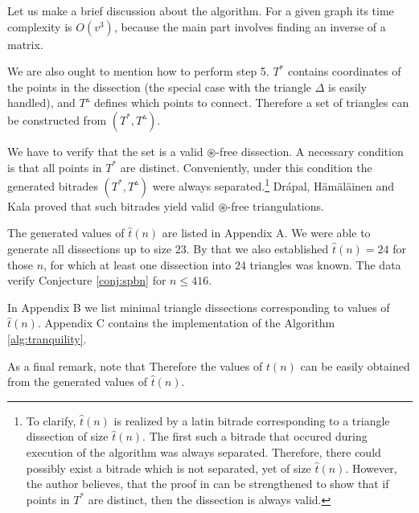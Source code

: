Let us make a brief discussion about the algorithm. For a given graph its time complexity is $O(v^3)$, because the main part involves finding an inverse of a matrix.

We are also ought to mention how to perform step 5. $T^*$ contains coordinates of the points in the dissection (the special case with the triangle $\Delta$ is easily handled), and $T^\vartriangle$ defines which points to connect. Therefore a set of triangles can be constructed from $(T^*,T^\vartriangle)$.

We have to verify that the set is a valid $\circledast$-free dissection. A necessary condition is that all points in $T^*$ are distinct. Conveniently, under this condition the generated bitrades $(T^*,T^\vartriangle)$ were always separated.\footnote{To clarify, $\hat t(n)$ is realized by a latin bitrade corresponding to a triangle dissection of size $\hat t(n)$. The first such a bitrade that occured during execution of the algorithm was always separated. Therefore, there could possibly exist a bitrade which is not separated, yet of size $\hat t(n)$. However, the author believes, that the proof in \cite{DrapalHamalainenKala10} can be strengthened to show that if points in $T^*$ are distinct, then the dissection is always valid.} Drápal, Hämäläinen and Kala \cite{DrapalHamalainenKala10} proved that such bitrades yield valid $\circledast$-free triangulations.

\bigskip

The generated values of $\hat t(n)$ are listed in Appendix A. We were able to generate all dissections up to size $23$. By that we also established $\hat t(n) = 24$ for those $n$, for which at least one dissection into $24$ triangles was known. The data verify Conjecture \ref{conj:spbn} for $n \leq 416$.

In Appendix B we list minimal triangle dissections corresponding to values of $\hat t(n)$. Appendix C contains the implementation of the Algorithm \ref{alg:tranquility}.

As a final remark, note that
%
Therefore the values of $t(n)$ can be easily obtained from the generated values of $\hat t(n)$.


